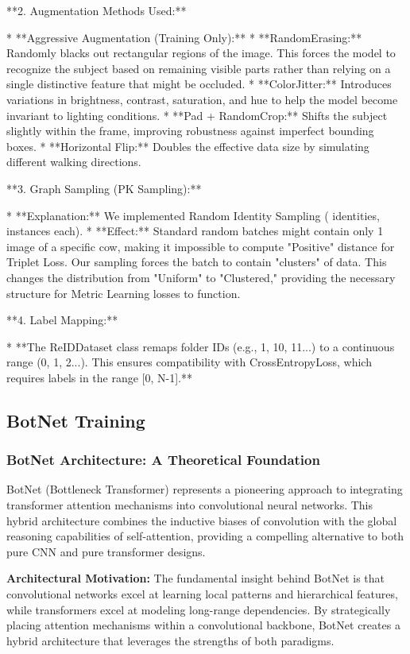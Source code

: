 \documentclass[a4paper,12pt]{article}
\begin{document}
**2. Augmentation Methods Used:**

* **Aggressive Augmentation (Training Only):**
  * **RandomErasing:** Randomly blacks out rectangular regions of the image. This forces the model to recognize the subject based on remaining visible parts rather than relying on a single distinctive feature that might be occluded.
  * **ColorJitter:** Introduces variations in brightness, contrast, saturation, and hue to help the model become invariant to lighting conditions.
  * **Pad + RandomCrop:** Shifts the subject slightly within the frame, improving robustness against imperfect bounding boxes.
* **Horizontal Flip:** Doubles the effective data size by simulating different walking directions.

**3. Graph Sampling (PK Sampling):**

* **Explanation:** We implemented Random Identity Sampling ( identities,  instances each).
* **Effect:** Standard random batches might contain only 1 image of a specific cow, making it impossible to compute "Positive" distance for Triplet Loss. Our sampling forces the batch to contain "clusters" of data. This changes the distribution from "Uniform" to "Clustered," providing the necessary structure for Metric Learning losses to function.

**4. Label Mapping:**

* **The ReIDDataset class remaps folder IDs (e.g., 1, 10, 11...) to a continuous range (0, 1, 2...). This ensures compatibility with CrossEntropyLoss, which requires labels in the range [0, N-1].**

\subsection{BotNet Training}

\subsubsection{BotNet Architecture: A Theoretical Foundation}

BotNet (Bottleneck Transformer) represents a pioneering approach to integrating transformer attention mechanisms into convolutional neural networks. This hybrid architecture combines the inductive biases of convolution with the global reasoning capabilities of self-attention, providing a compelling alternative to both pure CNN and pure transformer designs.

\textbf{Architectural Motivation:}
The fundamental insight behind BotNet is that convolutional networks excel at learning local patterns and hierarchical features, while transformers excel at modeling long-range dependencies. By strategically placing attention mechanisms within a convolutional backbone, BotNet creates a hybrid architecture that leverages the strengths of both paradigms.
\end{document}
